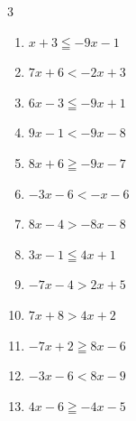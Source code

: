 \begin{multicols}{3}
\begin{enumerate}

  \item $x+3\leqq -9x-1$


  \item $7x+6<-2x+3$


  \item $6x-3\leqq -9x+1$


  \item $9x-1<-9x-8$


  \item $8x+6\geqq -9x-7$


  \item $-3x-6<-x-6$

        \phantom{$\displaystyle x>0$}

  \item $8x-4>-8x-8$


\columnbreak %

  \item $3x-1\leqq 4x+1$

        \phantom{$\displaystyle x\geqq -2$}

  \item $-7x-4>2x+5$

        \phantom{$\displaystyle x<-1$}

  \item $7x+8>4x+2$

        \phantom{$\displaystyle x>-2$}

  \item $-7x+2\geqq 8x-6$


  \item $-3x-6<8x-9$


  \item $4x-6\geqq -4x-5$



\end{enumerate}
\end{multicols}

